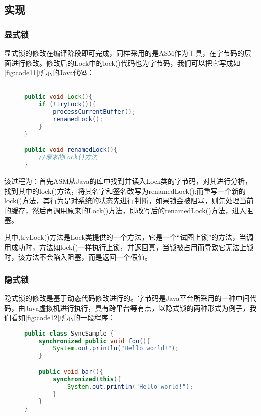 \subsection{实现}

\subsubsection{显式锁}

显式锁的修改在编译阶段即可完成，同样采用的是ASM作为工具，在字节码的层面进行修改。修改后的Lock中的lock()代码也为字节码，我们可以把它写成如\ref{fig:code11}所示的Java代码：

\begin{figure}[!htp]
\begin{lstlisting}[language=Java]

public void Lock(){
	if (!tryLock()){
		processCurrentBuffer();
		renamedLock();
	}
}

public void renamedLock(){
	//原来的Lock()方法
}

\end{lstlisting}
\end{figure}

该过程为：首先ASM从Java的库中找到并读入Lock类的字节码，对其进行分析，找到其中的lock()方法，将其名字和签名改写为renamedLock();而重写一个新的lock()方法，其行为是对系统的状态先进行判断，如果锁会被阻塞，则先处理当前的缓存，然后再调用原来的Lock()方法，即改写后的renamedLock()方法，进入阻塞。

其中,tryLock()方法是Lock类提供的一个方法，它是一个“试图上锁”的方法，当调用成功时，方法如lock()一样执行上锁，并返回真，当锁被占用而导致它无法上锁时，该方法不会陷入阻塞，而是返回一个假值。

\subsubsection{隐式锁}

隐式锁的修改是基于动态代码修改进行的。字节码是Java平台所采用的一种中间代码，由Java虚拟机进行执行，具有跨平台等有点，以隐式锁的两种形式为例子，我们看如\ref{fig:code12}所示的一段程序：

\begin{figure}[!htp]
\begin{lstlisting}[language=Java]
public class SyncSample {
	synchronized public void foo(){
		System.out.println("Hello world!");
	}

	public void bar(){
		synchronized(this){
			System.out.println("Hello world!");
		}
	}
}
\end{lstlisting}
\end{figure}

